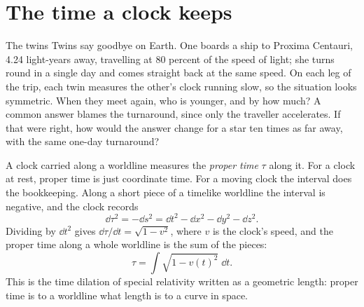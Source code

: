 \section{The time a clock keeps}\label{sec:proper-time}

\begin{thought}{The twins}
Twins say goodbye on Earth. One boards a ship to Proxima Centauri, 4.24
light-years away, travelling at 80 percent of the speed of light; she turns
round in a single day and comes straight back at the same speed. On each leg
of the trip, each twin measures the other's clock running slow, so the
situation looks symmetric. When they meet again, who is younger, and by how
much? A common answer blames the turnaround, since only the traveller
accelerates. If that were right, how would the answer change for a star ten
times as far away, with the same one-day turnaround?
\end{thought}

A clock carried along a worldline measures the \emph{proper time} $\tau$ along
it. For a clock at rest, proper time is just coordinate time. For a moving
clock the interval does the bookkeeping. Along a short piece of a timelike
worldline the interval is negative, and the clock records
\begin{equation}
  \dd\tau^{2} = -\dd s^{2} = \dd t^{2} - \dd x^{2} - \dd y^{2} - \dd z^{2}.
  \label{eq:proper-time}
\end{equation}
Dividing by $\dd t^{2}$ gives $\dd\tau/\dd t = \sqrt{1 - v^{2}}$, where $v$ is
the clock's speed, and the proper time along a whole worldline is the sum of
the pieces:
\begin{equation}
  \tau = \int \sqrt{1 - v(t)^{2}}\;\dd t .
  \label{eq:proper-time-integral}
\end{equation}
This is the time dilation of special relativity written as a geometric length:
proper time is to a worldline what length is to a curve in space.

